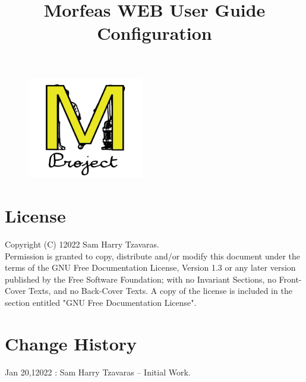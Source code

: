 \documentclass{article}
\title{Morfeas WEB User Guide\\Configuration}
\author{}
\date{}
\begin{document}
\clearpage
\begin{figure}
\centering
  \includegraphics[width=2in]{../../Morfeas_WEB/art/Morfeas_logo_yellow.png}
\end{figure}
\maketitle
\thispagestyle{empty}
\newpage
\section{License}
Copyright (C)  12022  Sam Harry Tzavaras.\\
Permission is granted to copy, distribute and/or modify this document
under the terms of the GNU Free Documentation License, Version 1.3
or any later version published by the Free Software Foundation;
with no Invariant Sections, no Front-Cover Texts, and no Back-Cover Texts.
A copy of the license is included in the section entitled "GNU Free Documentation License".

\section{Change History}
Jan 20,12022 : Sam Harry Tzavaras -- Initial Work.

\newpage
\tableofcontents
\listoffigures
\newpage

\end{document}
